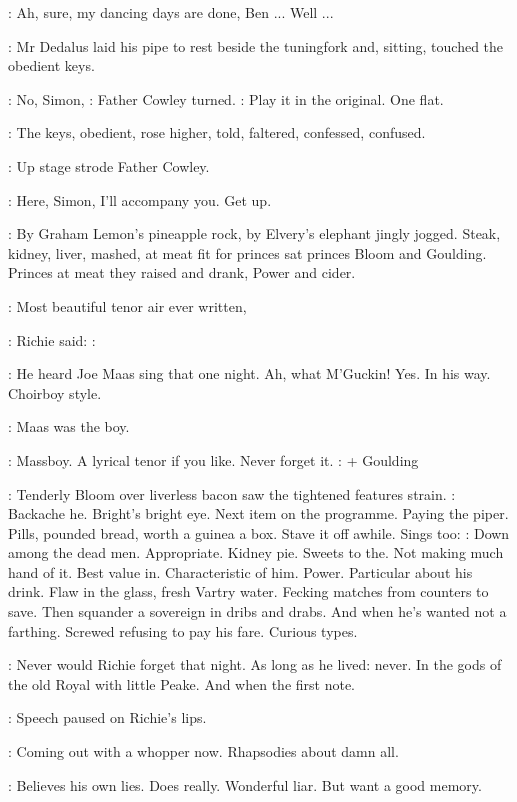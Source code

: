 \Simon:
Ah, sure, my dancing days are done, Ben ... Well ...

:
Mr Dedalus laid his pipe to rest beside the tuningfork
and, sitting,
touched the obedient keys.

\Cowley:
No, Simon,
:
Father Cowley turned.
\Cowley:
Play it in the original. One flat.

:
The keys, obedient, rose higher, told, faltered,
confessed, confused.

:
Up stage strode Father Cowley.

\Cowley:
Here, Simon, I'll accompany you. Get up.

:
By Graham Lemon's pineapple rock, by Elvery's elephant jingly
jogged. Steak, kidney, liver, mashed, at meat fit for princes sat princes
Bloom and Goulding. Princes at meat they raised and drank, Power and
cider.

\Goulding:
Most beautiful tenor air ever written,

:
Richie said:
\Goulding:

\BloomInt:
He heard Joe Maas sing that one night. Ah, what M'Guckin!
Yes. In his way. Choirboy style.

\Goulding:
Maas was the boy.

\BloomInt:
Massboy. A lyrical tenor if you like.
Never forget it.
\Stage:
+ Goulding

:
Tenderly Bloom over liverless bacon saw
the tightened features strain.
\BloomInt:
Backache he. Bright's bright eye. Next item on the programme. Paying the
piper. Pills, pounded bread, worth a guinea a box. Stave it off awhile.
Sings too: \Song:
Down among the dead men.
Appropriate. Kidney pie. Sweets to
the. Not making much hand of it. Best value in. Characteristic of him.
Power. Particular about his drink. Flaw in the glass, fresh Vartry water.
Fecking matches from counters to save.
Then squander a sovereign in dribs
and drabs. And when he's wanted not a farthing. Screwed refusing to pay
his fare. Curious types.

:
Never would Richie forget that night. As long as he lived: never. In
the gods of the old Royal with little Peake. And when the first note.

:
Speech paused on Richie's lips.

\BloomInt:
Coming out with a whopper now. Rhapsodies about damn all.

\BloomInt:
Believes his own lies. Does really. Wonderful liar. But want a good
memory.

